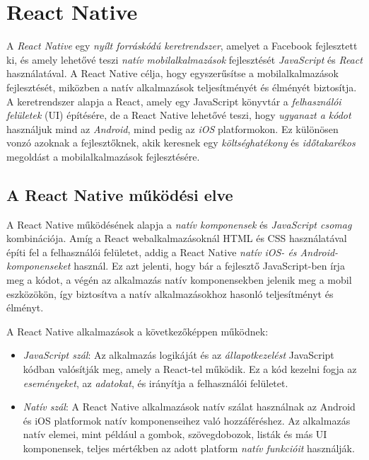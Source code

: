 \documentclass[
]{thesis-ekf}
\theoremstyle{definition}
\theoremstyle{remark}
\begin{document}
\section{React Native}
A \emph{React Native} egy \emph{nyílt forráskódú keretrendszer}, amelyet a Facebook fejlesztett ki, és amely lehetővé teszi \emph{natív mobilalkalmazások} fejlesztését \emph{JavaScript} és \emph{React} használatával. A React Native célja, hogy egyszerűsítse a mobilalkalmazások fejlesztését, miközben a natív alkalmazások teljesítményét és élményét biztosítja. A keretrendszer alapja a React, amely egy JavaScript könyvtár a \emph{felhasználói felületek} (UI) építésére, de a React Native lehetővé teszi, hogy \emph{ugyanazt a kódot} használjuk mind az \emph{Android}, mind pedig az \emph{iOS} platformokon. Ez különösen vonzó azoknak a fejlesztőknek, akik keresnek egy \emph{költséghatékony} és \emph{időtakarékos} megoldást a mobilalkalmazások fejlesztésére. \cite{mobilfejlesztes, reactNativeOfficial}

\subsection{A React Native működési elve}
A React Native működésének alapja a \emph{natív komponensek} és \emph{JavaScript csomag} kombinációja. Amíg a React webalkalmazásoknál HTML és CSS használatával építi fel a felhasználói felületet, addig a React Native \emph{natív iOS- és Android-komponenseket} használ. Ez azt jelenti, hogy bár a fejlesztő JavaScript-ben írja meg a kódot, a végén az alkalmazás natív komponensekben jelenik meg a mobil eszközökön, így biztosítva a natív alkalmazásokhoz hasonló teljesítményt és élményt. \cite{mobilfejlesztes, reactNativeOfficial}

A React Native alkalmazások a következőképpen működnek: \begin{itemize} \item \emph{JavaScript szál}: Az alkalmazás logikáját és az \emph{állapotkezelést} JavaScript kódban valósítják meg, amely a React-tel működik. Ez a kód kezelni fogja az \emph{eseményeket}, az \emph{adatokat}, és irányítja a felhasználói felületet. \item \emph{Natív szál}: A React Native alkalmazások natív szálat használnak az Android és iOS platformok natív komponenseihez való hozzáféréshez. Az alkalmazás natív elemei, mint például a gombok, szövegdobozok, listák és más UI komponensek, teljes mértékben az adott platform \emph{natív funkcióit} használják. \end{itemize}
\end{document}
